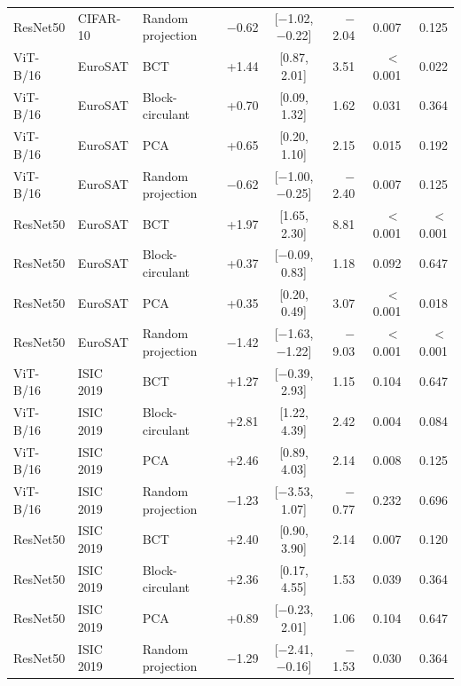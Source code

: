 \documentclass[10pt]{article}
\begin{document}
\begin{longtable}{lllrcrrr}
ResNet50 & CIFAR-10 & Random projection & $-$0.62 & [$-$1.02, $-$0.22] & $-$2.04 & 0.007 & 0.125 \\
ViT-B/16 & EuroSAT & BCT & +1.44 & [0.87, 2.01] & 3.51 & $<$0.001 & 0.022 \\
ViT-B/16 & EuroSAT & Block-circulant & +0.70 & [0.09, 1.32] & 1.62 & 0.031 & 0.364 \\
ViT-B/16 & EuroSAT & PCA & +0.65 & [0.20, 1.10] & 2.15 & 0.015 & 0.192 \\
ViT-B/16 & EuroSAT & Random projection & $-$0.62 & [$-$1.00, $-$0.25] & $-$2.40 & 0.007 & 0.125 \\
ResNet50 & EuroSAT & BCT & +1.97 & [1.65, 2.30] & 8.81 & $<$0.001 & $<$0.001 \\
ResNet50 & EuroSAT & Block-circulant & +0.37 & [$-$0.09, 0.83] & 1.18 & 0.092 & 0.647 \\
ResNet50 & EuroSAT & PCA & +0.35 & [0.20, 0.49] & 3.07 & $<$0.001 & 0.018 \\
ResNet50 & EuroSAT & Random projection & $-$1.42 & [$-$1.63, $-$1.22] & $-$9.03 & $<$0.001 & $<$0.001 \\
ViT-B/16 & ISIC 2019 & BCT & +1.27 & [$-$0.39, 2.93] & 1.15 & 0.104 & 0.647 \\
ViT-B/16 & ISIC 2019 & Block-circulant & +2.81 & [1.22, 4.39] & 2.42 & 0.004 & 0.084 \\
ViT-B/16 & ISIC 2019 & PCA & +2.46 & [0.89, 4.03] & 2.14 & 0.008 & 0.125 \\
ViT-B/16 & ISIC 2019 & Random projection & $-$1.23 & [$-$3.53, 1.07] & $-$0.77 & 0.232 & 0.696 \\
ResNet50 & ISIC 2019 & BCT & +2.40 & [0.90, 3.90] & 2.14 & 0.007 & 0.120 \\
ResNet50 & ISIC 2019 & Block-circulant & +2.36 & [0.17, 4.55] & 1.53 & 0.039 & 0.364 \\
ResNet50 & ISIC 2019 & PCA & +0.89 & [$-$0.23, 2.01] & 1.06 & 0.104 & 0.647 \\
ResNet50 & ISIC 2019 & Random projection & $-$1.29 & [$-$2.41, $-$0.16] & $-$1.53 & 0.030 & 0.364 \\
\end{longtable}
\vspace{-6pt}{\footnotesize Differences in Macro F1 percentage points; $g$, Hedges' $g$ (not defined for the interaction).\par}
\normalsize
\end{document}
